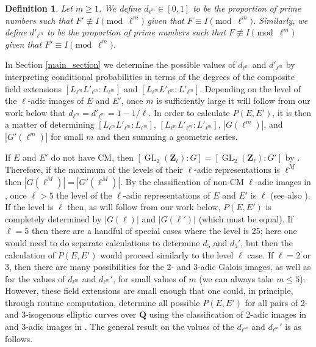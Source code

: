 \documentclass{amsart}
\newcommand{\Zl}{\mathbf{Z}_{\ell}}
\newcommand{\Q}{\mathbf{Q}}
\newcommand{\GL}{\operatorname{GL}}
\numberwithin{equation}{section}
\theoremstyle{plain}
\newtheorem{defn}[equation]{Definition}
\theoremstyle{remark}
\begin{document}
\begin{defn}
Let $m \geq 1$. We define $d_{\ell^m} \in [0, 1]$  to be the proportion of prime numbers such
that $F' \not \equiv I \pmod{\ell^m}$ given that $F \equiv I \pmod{\ell^m}$.  Similarly, we define $d'_{\ell^m}$ to be the proportion of prime numbers such
that $F \not \equiv I \pmod{\ell^m}$ given that $F' \equiv I \pmod{\ell^m}$. 
\end{defn}

In Section \ref{main_section} we determine the possible values of $d_{\ell^m}$ and $d'_{\ell^m}$ by interpreting conditional probabilities in terms of the degrees of the composite field extensions $[L_{\ell^m}L'_{\ell^m}:L_{\ell^m}]$ and $[L_{\ell^m}L'_{\ell^m}:L'_{\ell^m}]$.  Depending on the level of the $\ell$-adic images of $E$ and $E'$, once $m$ is sufficiently large it will follow from our work below that $d_{\ell^m} = d'_{\ell^m} = 1-1/\ell$.   In order to calculate $P(E,E')$, it is then a matter of determining $[L_{\ell^m}L'_{\ell^m}:L_{\ell^m}]$, $[L_{\ell^m}L'_{\ell^m}:L'_{\ell^m}]$, $|G(\ell^m)|$, and $|G'(\ell^m)|$ for small $m$ and then summing a geometric series.

If $E$ and $E'$ do not have CM, then $[\GL_2(\Zl):G] = [\GL_2(\Zl):G']$ by \cite[Prop.~2.1.1]{greenberg5}.  Therefore, if the maximum of the levels of their $\ell$-adic representations is $\ell^M$ then $|G(\ell^M)| = |G'(\ell^M)|$.  By the classification of non-CM $\ell$-adic images in \cite{rszb}, once $\ell >5$ the level of the $\ell$-adic representations of $E$ and $E'$ is $\ell$ (see also \cite{greenberg7}).  If the level is  $\ell$ then, as will follow from our work below, $P(E,E')$ is completely determined  by $|G(\ell)|$ and $|G(\ell')|$ (which must be equal).  If $\ell=5$ then there are a handful of special cases where the level is 25; here one would need to do separate calculations to determine $d_5$ and $d_5'$, but then the calculation of $P(E,E')$ would proceed similarly to the level $\ell$ case.  If $\ell=2$ or 3, then there are many possibilities for the 2- and 3-adic Galois images, as well as for the values of $d_{\ell^m}$ and $d_{\ell^m}'$, for small values of $m$ (we can always take $m \leq 5$).  However, these field extensions are small enough that one could, in principle, through routine computation, determine all possible $P(E,E')$ for all pairs of 2- and 3-isogenous elliptic curves over $\Q$ using the classification of 2-adic images in \cite{rzb} and 3-adic images in \cite{rszb}.   The general result on the values of the $d_{\ell^m}$ and $d_{\ell^m}'$ is as follows.
\end{document}
